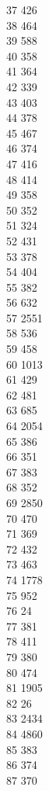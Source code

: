 { 37	426 \\
 38	464 \\
 39	588 \\
 40	358 \\
 41	364 \\
 42	339 \\
 43	403 \\
 44	378 \\
 45	467 \\
 46	374 \\
 47	416 \\
 48	414 \\
 49	358 \\
 50	352 \\
 51	324 \\
 52	431 \\
 53	378 \\
 54	404 \\
 55	382 \\
 56	632 \\
 57	2551 \\
 58	536 \\
 59	458 \\
 60	1013 \\
 61	429 \\
 62	481 \\
 63	685 \\
 64	2054 \\
 65	386 \\
 66	351 \\
 67	383 \\
 68	352 \\
 69	2850 \\
 70	470 \\
 71	369 \\
 72	432 \\
 73	463 \\
 74	1778 \\
 75	952 \\
 76	24 \\
 77	381 \\
 78	411 \\
 79	380 \\
 80	474 \\
 81	1905 \\
 82	26 \\
 83	2434 \\
 84	4860 \\
 85	383 \\
 86	374 \\
 87	370 \\
}
